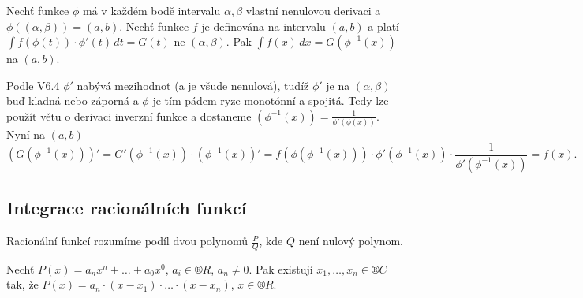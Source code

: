 \documentclass[12pt]{article}                   %
\begin{document}
        \begin{veta}[2. o substituci]
            Nechť funkce $\phi$ má v každém bodě intervalu $\alpha, \beta$ vlastní nenulovou derivaci a $\phi((\alpha, \beta)) = (a, b)$. Nechť funkce $f$ je definována na intervalu $(a, b)$ a platí $\int f(\phi(t))·\phi'(t)\,dt = G(t)$ ne $(\alpha, \beta)$. Pak $\int f(x)\,dx = G(\phi^{-1}(x))$ na $(a, b)$.

            \begin{dukazin}
                Podle V6.4 $\phi'$ nabývá mezihodnot (a je všude nenulová), tudíž $\phi'$ je na $(\alpha, \beta)$ buď kladná nebo záporná a $\phi$ je tím pádem ryze monotónní a spojitá. Tedy lze použít větu o derivaci inverzní funkce a dostaneme $(\phi^{-1}(x)) = \frac{1}{\phi'(\phi(x))}$. Nyní na $(a, b)$
                $$ (G(\phi^{-1}(x)))' = G'(\phi^{-1}(x))·(\phi^{-1}(x))' = f(\phi(\phi^{-1}(x)))·\phi'(\phi^{-1}(x))·\frac{1}{\phi'(\phi^{-1}(x))} = f(x). $$ 
            \end{dukazin}
        \end{veta}

    \subsection{Integrace racionálních funkcí}
        \begin{definice}
            Racionální funkcí rozumíme podíl dvou polynomů $\frac{P}{Q}$, kde $Q$ není nulový polynom.
        \end{definice}

        \begin{veta}
            Nechť $P(x) = a_nx^n + … + a_0x^0$, $a_i \in ®R$, $a_n ≠ 0$. Pak existují $x_1, …, x_n \in ®C$ tak, že $P(x) = a_n·(x - x_1)·…·(x - x_n)$, $x \in ®R$.
        \end{veta}
\end{document}
